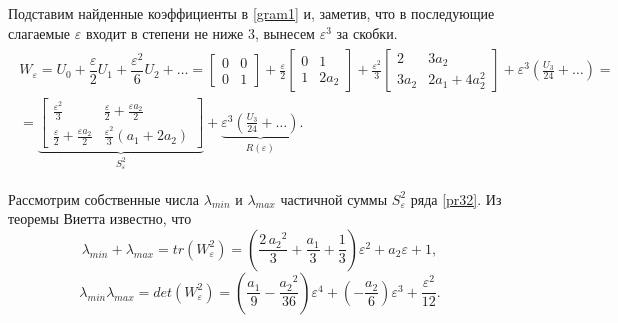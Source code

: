 \documentclass[../main.tex]{subfiles}
\begin{document}
 Подставим найденные коэффициенты в \eqref{gram1} и, заметив, что в последующие слагаемые $ \varepsilon $ входит в степени не ниже $ 3 $, вынесем $ \varepsilon^3 $ за скобки.
 \begin{gather}\label{pr32}
	 \begin{gathered}
		 W_{\varepsilon} = U_0 + \dfrac{\varepsilon}{2} U_1 + \dfrac{\varepsilon^2}{6}U_2 + \dots = \left[ {\begin{array}{*{20}{c}}
				 0&0\\
				 0&1
		 \end{array}}\right] +\frac{\varepsilon}{2} \left[ {\begin{array}{*{20}{c}}
				 0&1\\
				 1&2a_2
		 \end{array}}\right] +\frac{\varepsilon^2}{3} \left[ {\begin{array}{*{20}{c}}
				 2&3a_2\\
				 3a_2&2a_1+4a_2^2
		 \end{array}}\right] + \varepsilon^3 \left( \frac{U_3}{24} + \dots \right) =
		 \\
		 = \underbrace{\left[ \begin{array}{*{20}{c}}
				 \frac{\varepsilon^2}{3} & \frac{\varepsilon}{2} + \frac{\varepsilon a_2}{2} \\ 
				 \frac{\varepsilon}{2} + \frac{\varepsilon a_2}{2} & \frac{\varepsilon^2}{3}(a_1+2a_2) 
			 \end{array} \right]}_{S_{\varepsilon}^{2}} + \underbrace{ \varepsilon^3 \left( \frac{U_3}{24} + \dots \right)}_{R(\varepsilon)}.
	 \end{gathered}
 \end{gather}
 
 
 Рассмотрим собственные числа $ \lambda_{min} $ и $ \lambda_{max} $ частичной суммы $ S_{\varepsilon}^{2} $ ряда \eqref{pr32}. Из теоремы Виетта известно, что 
 \begin{equation}\label{lambdamax}
	 \lambda_{min} + \lambda_{max} = tr(W_{\varepsilon}^{2}) = \left(\frac{2\,{a_{2}}^2}{3}+\frac{a_{1}}{3}+\frac{1}{3}\right)\varepsilon^2+a_{2}\varepsilon+1,
 \end{equation}
 \begin{equation}\label{lambdamin}
	 \lambda_{min}  \lambda_{max} = det(W_{\varepsilon}^{2}) = \left(\frac{a_{1}}{9}-\frac{{a_{2}}^2}{36}\right)\varepsilon^4+\left(-\frac{a_{2}}{6}\right)\varepsilon^3+\frac{\varepsilon^2}{12}.
 \end{equation}
 
\end{document}
